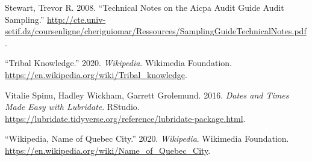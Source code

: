 \documentclass[
]{book}
\begin{document}
\leavevmode\hypertarget{ref-sampling-technical}{}%
Stewart, Trevor R. 2008. ``Technical Notes on the Aicpa Audit Guide Audit Sampling.'' \url{http://cte.univ-setif.dz/coursenligne/cheriguiomar/Ressources/SamplingGuideTechnicalNotes.pdf}.

\leavevmode\hypertarget{ref-tribal-knowledge}{}%
``Tribal Knowledge.'' 2020. \emph{Wikipedia}. Wikimedia Foundation. \url{https://en.wikipedia.org/wiki/Tribal_knowledge}.

\leavevmode\hypertarget{ref-lubridate-help}{}%
Vitalie Spinu, Hadley Wickham, Garrett Grolemund. 2016. \emph{Dates and Times Made Easy with Lubridate}. RStudio. \url{https://lubridate.tidyverse.org/reference/lubridate-package.html}.

\leavevmode\hypertarget{ref-quebec}{}%
``Wikipedia, Name of Quebec City.'' 2020. \emph{Wikipedia}. Wikimedia Foundation. \url{https://en.wikipedia.org/wiki/Name_of_Quebec_City}.
\end{document}
